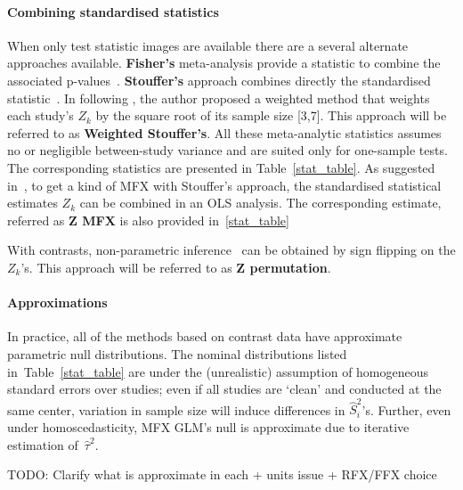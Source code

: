 \documentclass[preprint,12pt]{elsarticle}
\newcommand{\vareffect}[1][i]{\hat S^2_{#1}}
\newcommand{\zeffect}[1][\studyidx]{Z_{#1}}
\newcommand{\studyidx}{k}
\newcommand{\estvarBetween}{\hat\tau^2}
\begin{document}
\paragraph{Combining standardised statistics} 
When only test statistic images are available there are a several alternate approaches available. \textbf{Fisher's} meta-analysis provide a statistic to combine the associated p-values~\cite{Fisher1932}. \textbf{Stouffer's} approach combines directly the standardised statistic~\cite{Stouffer1949}. In \cite{Zaykin2011} following \cite{Liptak1958}, the author proposed a weighted method that weights each study's $\zeffect$ by the square root of its sample size [3,7]. This approach will be referred to as \textbf{Weighted Stouffer's}. All these meta-analytic statistics assumes no or negligible between-study variance and are suited only for one-sample tests. The corresponding statistics are presented in Table~\ref{stat_table}.
As suggested in~\cite{Salimi-khorshidi2009}, to get a kind of MFX with Stouffer's approach, the standardised statistical estimates $\zeffect$ can be combined in an OLS analysis. The corresponding estimate, referred as \textbf{Z MFX} is also provided in~\ref{stat_table}

With contrasts, non-parametric inference~\cite{Holmes1996,Nichols2002} can be obtained by sign flipping on the $\zeffect$'s. This approach will be referred to as \textbf{Z permutation}.

\paragraph{Approximations}  In practice, all of the methods based on contrast data have approximate parametric null distributions.  The nominal distributions listed in~Table~\ref{stat_table} are under the (unrealistic) assumption of homogeneous standard errors over studies; even if all studies are `clean' and conducted at the same center, variation in sample size will induce differences in $\vareffect$'s.  Further, even under homoscedasticity, MFX GLM's null is approximate due to iterative estimation of~$\estvarBetween$.


TODO: Clarify what is approximate in each + units issue + RFX/FFX choice

\end{document}
